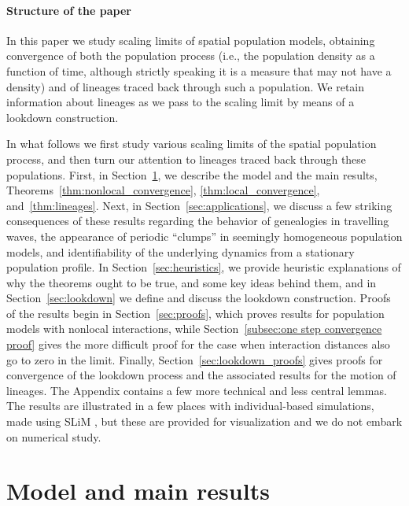 \documentclass[EJP]{ejpecp} %
\newcommand{\citep}[1]{\cite{#1}}
\begin{document}
\paragraph{Structure of the paper}

In this paper we study scaling limits of spatial population models,
obtaining convergence of both the population process
(i.e., the population density as a function of time,
although strictly speaking it is a measure that may not have a density)
and of lineages traced back through such a population.
We retain information about lineages as we pass to the scaling limit
by means of a lookdown construction.

In what follows we first study various scaling limits of the spatial population process,
and then turn our attention to lineages traced back through these populations.
First, in Section~\ref{sec: Model and main results},
we describe the model and the main results,
Theorems~\ref{thm:nonlocal_convergence}, \ref{thm:local_convergence}, and~\ref{thm:lineages}.
Next, in Section~\ref{sec:applications}, we discuss a few striking consequences of these results
regarding the behavior of genealogies in travelling waves,
the appearance of periodic ``clumps'' in seemingly homogeneous population models,
and identifiability of the underlying dynamics from a stationary population profile.
In Section~\ref{sec:heuristics}, we provide heuristic explanations
of why the theorems ought to be true,
and some key ideas behind them,
and in Section~\ref{sec:lookdown} we define and discuss the lookdown construction.
Proofs of the results begin in Section~\ref{sec:proofs},
which proves results for population models with nonlocal interactions,
while Section~\ref{subsec:one step convergence proof} gives the more difficult proof
for the case when interaction distances also go to zero in the limit.
Finally, Section~\ref{sec:lookdown_proofs} gives proofs for convergence of the lookdown process
and the associated results for the motion of lineages.
The Appendix contains a few more technical and less central lemmas.
The results are illustrated in a few places with individual-based simulations,
made using SLiM \citep{haller_slim_2019},
but these are provided for visualization and we do not embark on numerical study.



\section{Model and main results}
    \label{sec: Model and main results}
\end{document}
